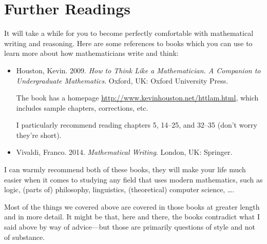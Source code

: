 \section{Further Readings}
\label{mathodology:literature}

It will take a while for you to become perfectly comfortable with mathematical writing and reasoning. Here are some references to books which you can use to learn more about how mathematicians write and think:

	\begin{itemize}
	
		\item Houston, Kevin. 2009. \emph{How to Think Like a Mathematician. A Companion to Undergraduate Mathematics}. Oxford, UK: Oxford University Press.
		
		The book has a homepage \url{http://www.kevinhouston.net/httlam.html}, which includes sample chapters, corrections, etc.
		
		I particularly recommend reading chapters 5, 14--25, and 32--35 (don't worry they're short).
		
		\item Vivaldi, Franco. 2014. \emph{Mathematical Writing}. London, UK: Springer. 
	
	\end{itemize}
	
\noindent I can warmly recommend both of these books, they will make your life much easier when it comes to studying any field that uses modern mathematics, such as logic, (parts of) philosophy, linguistics, (theoretical) computer science, \dots.

%
%
%

Most of the things we covered above are covered in those books at greater length and in more detail. It might be that, here and there, the books contradict what I said above by way of advice---but those are primarily questions of style and not of substance. 


\vfill

